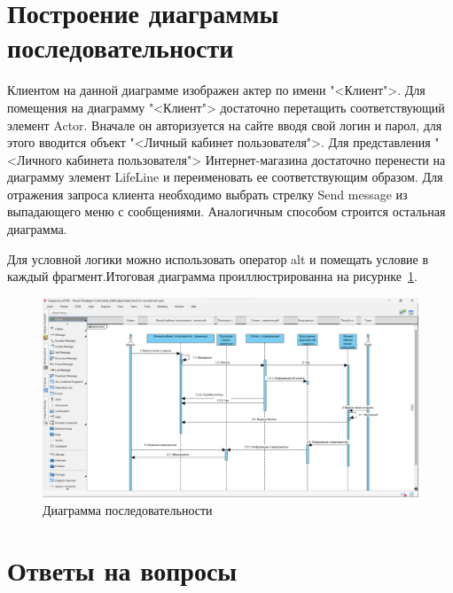 \section{Построение диаграммы последовательности}
Клиентом на данной диаграмме изображен актер по имени "<Клиент">.
Для помещения на диаграмму "<Клиент"> достаточно перетащить
соответствующий элемент Actor.
Вначале он авторизуется на сайте вводя свой логин и парол, для этого
вводится объект "<Личный кабинет пользователя">.
Для представления "<Личного кабинета пользователя"> Интернет-магазина
достаточно перенести на диаграмму элемент LifeLine и переименовать ее
соответствующим образом.
Для отражения запроса клиента необходимо выбрать
стрелку Send message из выпадающего меню с сообщениями.
Аналогичным способом строится остальная диаграмма.\par
Для условной логики можно использовать оператор alt и помещать
условие в каждый фрагмент.Итоговая диаграмма проиллюстрированна на рисурнке~\ref{fig:sequence}.

\begin{figure}[h!tp]
	\centering
	\includegraphics[width=1\textwidth]{img.png}
	\caption{Диаграмма последовательности}
	\label{fig:sequence}
\end{figure}

\newpage

\section*{Ответы на вопросы}

